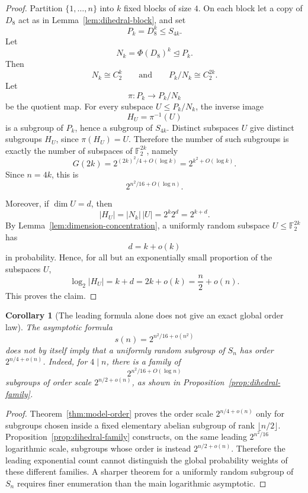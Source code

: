 \documentclass[a4paper,11pt]{amsart}
\newtheorem{corollary}[theorem]{Corollary}
\theoremstyle{remark}
\newcommand{\F}{\mathbb F}
\begin{document}
\begin{proof}
Partition \(\{1,\ldots,n\}\) into \(k\) fixed blocks of size \(4\). On each block let a copy of
\(D_8\) act as in Lemma~\ref{lem:dihedral-block}, and set
\[
        P_k=D_8^k\leq S_{4k}.
\]
Let
\[
        N_k=\Phi(D_8)^k\trianglelefteq P_k.
\]
Then
\[
        N_k\cong C_2^k
        \qquad\text{and}\qquad
        P_k/N_k\cong C_2^{2k}.
\]
Let
\[
        \pi:P_k\to P_k/N_k
\]
be the quotient map. For every subspace \(U\leq P_k/N_k\), the inverse image
\[
        H_U=\pi^{-1}(U)
\]
is a subgroup of \(P_k\), hence a subgroup of \(S_{4k}\). Distinct subspaces \(U\) give distinct
subgroups \(H_U\), since \(\pi(H_U)=U\). Therefore the number of such subgroups is exactly the
number of subspaces of \(\F_2^{2k}\), namely
\[
        G(2k)=2^{(2k)^2/4+O(\log k)}=2^{k^2+O(\log k)}.
\]
Since \(n=4k\), this is
\[
        2^{n^2/16+O(\log n)}.
\]

Moreover, if \(\dim U=d\), then
\[
        |H_U|=|N_k|\,|U|=2^k 2^d=2^{k+d}.
\]
By Lemma~\ref{lem:dimension-concentration}, a uniformly random subspace \(U\leq\F_2^{2k}\) has
\[
        d=k+o(k)
\]
in probability. Hence, for all but an exponentially small proportion of the subspaces \(U\),
\[
        \log_2 |H_U|=k+d=2k+o(k)=\frac n2+o(n).
\]
This proves the claim.
\end{proof}

\begin{corollary}[The leading formula alone does not give an exact global order law]\label{cor:order-caution}
The asymptotic formula
\[
        s(n)=2^{n^2/16+o(n^2)}
\]
does not by itself imply that a uniformly random subgroup of \(S_n\) has order
\(2^{n/4+o(n)}\). Indeed, for \(4\mid n\), there is a family of
\[
        2^{n^2/16+O(\log n)}
\]
subgroups of order scale \(2^{n/2+o(n)}\), as shown in Proposition~\ref{prop:dihedral-family}.
\end{corollary}

\begin{proof}
Theorem~\ref{thm:model-order} proves the order scale \(2^{n/4+o(n)}\) only for subgroups chosen
inside a fixed elementary abelian subgroup of rank \(\lfloor n/2\rfloor\). Proposition~\ref{prop:dihedral-family}
constructs, on the same leading \(2^{n^2/16}\) logarithmic scale, subgroups whose order is instead
\(2^{n/2+o(n)}\). Therefore the leading exponential count cannot distinguish the global
probability weights of these different families. A sharper theorem for a uniformly random subgroup
of \(S_n\) requires finer enumeration than the main logarithmic asymptotic.
\end{proof}
\end{document}
